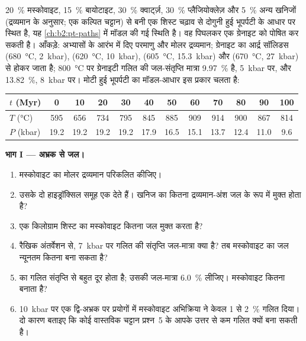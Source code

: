 \begin{problem}[{सप्ताहांत समस्या --- पिघले अभ्रक से एक प्लूटॉन}]\label{pb:b2:crustal-melting:1}
\qty{20}{\percent} मस्कोवाइट, \qty{15}{\percent} बायोटाइट,
\qty{30}{\percent} क्वार्ट्ज़, \qty{30}{\percent} प्लैजियोक्लेज़ और \qty{5}{\percent} अन्य
खनिजों (द्रव्यमान के अनुसार; एक कल्पित चट्टान) से बनी एक शिस्ट चढ़ाव से दोगुनी हुई भूपर्पटी के आधार पर स्थित है, यह
\cref{ch:b2:pt-paths} में मॉडल की गई स्थिति है। वह पिघलकर एक ग्रेनाइट  को पोषित कर सकती है। आँकड़े:
अभ्यासों के आरंभ में दिए परमाणु और मोलर द्रव्यमान; ग्रेनाइट का आर्द्र सॉलिडस
(\qty{680}{\celsius}, \qty{2}{kbar}), (\qty{620}{\celsius}, \qty{10}{kbar}),
(\qty{605}{\celsius}, \qty{15.3}{kbar}) और (\qty{670}{\celsius}, \qty{27}{kbar}) से होकर जाता है;
\qty{800}{\celsius} पर ग्रेनाइटी गलित की जल-संतृप्ति मात्रा \qty{9.97}{\percent} है,
\qty{5}{kbar} पर, और \qty{13.82}{\percent}, \qty{8}{kbar} पर। मोटी हुई भूपर्पटी का मॉडल-आधार इस प्रकार चलता है:

\smallskip
\begin{center}\small
\begin{tabular}{l|ccccccccccc}
$t$ (\unit{Myr}) & 0 & 10 & 20 & 30 & 40 & 50 & 60 & 70 & 80 & 90 & 100\\ \hline
$T$ (\unit{\celsius}) & 595 & 656 & 734 & 795 & 845 & 885 & 909 & 914 & 900 & 867 & 814\\
$P$ (\unit{kbar}) & 19.2 & 19.2 & 19.2 & 19.2 & 17.9 & 16.5 & 15.1 & 13.7 & 12.4 & 11.0 & 9.6
\end{tabular}
\end{center}
\smallskip

\noindent\textbf{भाग I --- अभ्रक से जल।}
\begin{enumerate}
\item मस्कोवाइट  का मोलर द्रव्यमान परिकलित कीजिए।
\item उसके दो हाइड्रॉक्सिल समूह एक  देते हैं। खनिज का कितना द्रव्यमान-अंश
जल के रूप में मुक्त होता है?
\item एक किलोग्राम शिस्ट का मस्कोवाइट कितना जल मुक्त करता है?
\item रैखिक अंतर्वेशन से, \qty{7}{kbar} पर गलित की संतृप्ति जल-मात्रा
क्या है? तब मस्कोवाइट का जल न्यूनतम कितना  बना सकता है?
\item {} का गलित संतृप्ति से बहुत दूर होता है; उसकी जल-मात्रा
\qty{6.0}{\percent} लीजिए। मस्कोवाइट कितना  बनाता है?
\item \qty{10}{kbar} पर एक द्वि-अभ्रक  पर प्रयोगों में मस्कोवाइट अभिक्रिया
ने केवल 1 से \qty{2}{\percent} गलित दिया। दो कारण बताइए कि कोई वास्तविक चट्टान प्रश्न~5 के आपके उत्तर से
कम गलित क्यों बना सकती है।
\end{enumerate}


\end{problem}
